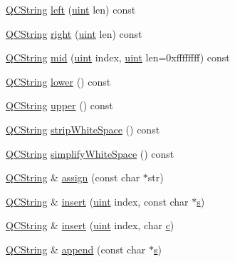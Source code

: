 \begin{DoxyCompactItemize}
\item 
\hyperlink{class_q_c_string}{Q\+C\+String} \hyperlink{class_q_c_string_a6a2fe6ada0605871e97ca63e0b0f8c01}{left} (\hyperlink{qglobal_8h_a4d3943ddea65db7163a58e6c7e8df95a}{uint} len) const 
\item 
\hyperlink{class_q_c_string}{Q\+C\+String} \hyperlink{class_q_c_string_aab421c3aa163d1b57e2616f35dca502d}{right} (\hyperlink{qglobal_8h_a4d3943ddea65db7163a58e6c7e8df95a}{uint} len) const 
\item 
\hyperlink{class_q_c_string}{Q\+C\+String} \hyperlink{class_q_c_string_a5a894e551bcabc27fa3a86befe81cfd8}{mid} (\hyperlink{qglobal_8h_a4d3943ddea65db7163a58e6c7e8df95a}{uint} index, \hyperlink{qglobal_8h_a4d3943ddea65db7163a58e6c7e8df95a}{uint} len=0xffffffff) const 
\item 
\hyperlink{class_q_c_string}{Q\+C\+String} \hyperlink{class_q_c_string_a8521f824539675988b339970f22c7ae4}{lower} () const 
\item 
\hyperlink{class_q_c_string}{Q\+C\+String} \hyperlink{class_q_c_string_a81e6d9b22b9137eaa7efd549f8f65a09}{upper} () const 
\item 
\hyperlink{class_q_c_string}{Q\+C\+String} \hyperlink{class_q_c_string_a9da74f01c3d2a710256ef95bf7acfd31}{strip\+White\+Space} () const 
\item 
\hyperlink{class_q_c_string}{Q\+C\+String} \hyperlink{class_q_c_string_aa0d23b87c1407fb495fb949dbef8dfc5}{simplify\+White\+Space} () const 
\item 
\hyperlink{class_q_c_string}{Q\+C\+String} \& \hyperlink{class_q_c_string_a3d5edf23543be731297cd5dccbf29c22}{assign} (const char $\ast$str)
\item 
\hyperlink{class_q_c_string}{Q\+C\+String} \& \hyperlink{class_q_c_string_af076f8a173eb13ab76516c407150d370}{insert} (\hyperlink{qglobal_8h_a4d3943ddea65db7163a58e6c7e8df95a}{uint} index, const char $\ast$\hyperlink{060__command__switch_8tcl_a011c73f2dbb87635a3b4206c72355f6e}{s})
\item 
\hyperlink{class_q_c_string}{Q\+C\+String} \& \hyperlink{class_q_c_string_aa17bc879a1a58d5403aea176bdab6373}{insert} (\hyperlink{qglobal_8h_a4d3943ddea65db7163a58e6c7e8df95a}{uint} index, char \hyperlink{060__command__switch_8tcl_ab14f56bc3bd7680490ece4ad7815465f}{c})
\item 
\hyperlink{class_q_c_string}{Q\+C\+String} \& \hyperlink{class_q_c_string_a303cf8f6a8f57a92e3bda9423ca643aa}{append} (const char $\ast$\hyperlink{060__command__switch_8tcl_a011c73f2dbb87635a3b4206c72355f6e}{s})
\item 

\end{DoxyCompactItemize}
